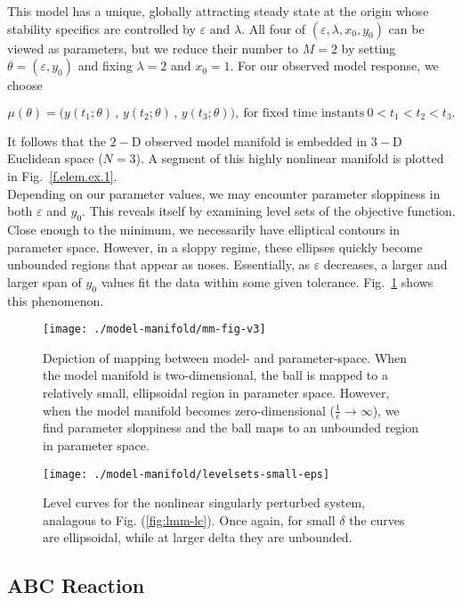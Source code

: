 \documentclass[11pt]{article}
\newcommand{\p}{\theta}
\newcommand{\eps}{\varepsilon}
\newcommand{\be}{\begin{equation}}
\newcommand{\ee}{\end{equation}}
\begin{document}
This model has a unique, globally attracting steady state at the
origin whose stability specifics are controlled by $\eps$ and
$\lambda$.  All four of $(\eps,\lambda,x_0,y_0)$ can be viewed as
parameters, but we reduce their number to $M=2$ by setting
$\p = (\eps,y_0)$ and fixing $\lambda= 2$ and $x_0 = 1$.  For our
observed model response, we choose

\be
 \mu(\p) = \big( y(t_1;\p) \,,\, y(t_2;\p) \,,\, y(t_3;\p) \big) ,
\ \mbox{for fixed time instants} \
 0 < t_1 < t_2 < t_3 .
\label{elem-mu}
\ee

It follows that the $2-$D observed model manifold is embedded in $3-$D
Euclidean space ($N=3$).  A segment of this highly nonlinear manifold
is plotted in Fig.~\ref{f.elem.ex.1}. \\

Depending on our parameter values, we may encounter parameter
sloppiness in both $\eps$ and $y_0$. This reveals itself by examining
level sets of the objective function. Close enough to the minimum, we
necessarily have elliptical contours in parameter space. However, in a
sloppy regime, these ellipses quickly become unbounded regions that
appear as noses. Essentially, as $\eps$ decreases, a larger and larger
span of $y_0$ values fit the data within some given
tolerance. Fig.~\ref{f.noses} shows this phenomenon.

\begin{figure}
  \centering
  \texttt{[image: ./model-manifold/mm-fig-v3]}
  \caption{Depiction of mapping between model- and
    parameter-space. When the model manifold is two-dimensional, the
    ball is mapped to a relatively small, ellipsoidal region in
    parameter space. However, when the model manifold becomes
    zero-dimensional ($\frac{1}{\epsilon} \rightarrow \infty$), we
    find parameter sloppiness and the ball maps to an unbounded region
    in parameter space.}
\end{figure}

\begin{figure}
  \centering
  \texttt{[image: ./model-manifold/levelsets-small-eps]}
  \caption{Level curves for the nonlinear singularly perturbed
    system, analagous to Fig. (\ref{fig:lmm-lc}). Once again, for
    small $\delta$ the curves are ellipsoidal, while at larger delta
    they are unbounded. \label{f.noses} }
\end{figure}


\subsection{ABC Reaction}
\end{document}

